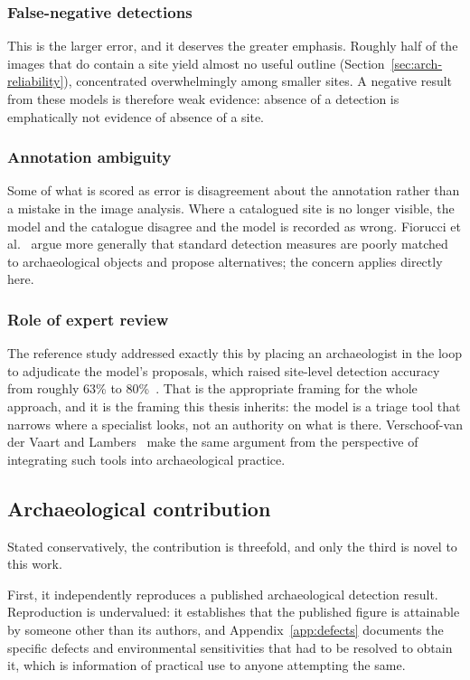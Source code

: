 \subsubsection{False-negative detections}
This is the larger error, and it deserves the greater emphasis. Roughly half of
the images that do contain a site yield almost no useful outline
(Section~\ref{sec:arch-reliability}), concentrated overwhelmingly among smaller
sites. A negative result from these models is therefore weak evidence: absence
of a detection is emphatically not evidence of absence of a site.

\subsubsection{Annotation ambiguity}
Some of what is scored as error is disagreement about the annotation rather
than a mistake in the image analysis. Where a catalogued site is no longer
visible, the model and the catalogue disagree and the model is recorded as
wrong. Fiorucci et al.~\cite{Fiorucci22} argue more generally that standard
detection measures are poorly matched to archaeological objects and propose
alternatives; the concern applies directly here.

\subsubsection{Role of expert review}
The reference study addressed exactly this by placing an archaeologist in the
loop to adjudicate the model's proposals, which raised site-level detection
accuracy from roughly 63\% to 80\%~\cite{Casini23}. That is the appropriate
framing for the whole approach, and it is the framing this thesis
inherits: the model is a triage tool that narrows where a specialist looks,
not an authority on what is there. Verschoof-van der Vaart and
Lambers~\cite{Verschoof22} make the same argument from the perspective of
integrating such tools into archaeological practice.

\subsection{Archaeological contribution}
\label{sec:arch-contribution}

Stated conservatively, the contribution is threefold, and only the third is
novel to this work.

First, it independently reproduces a published archaeological detection result.
Reproduction is undervalued: it establishes that the published figure is
attainable by someone other than its authors, and Appendix~\ref{app:defects}
documents the specific defects and environmental sensitivities that had to be
resolved to obtain it, which is information of practical use to anyone
attempting the same.

